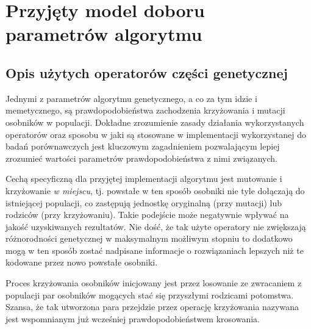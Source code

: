 \newpage
\chapter{Przyjęty model doboru parametrów algorytmu}
\label{ch:przyjety_model_doboru_parametrow_algorytmu}
\section{Opis użytych operatorów części genetycznej}
\par
Jednymi z parametrów algorytmu genetycznego, a co za tym idzie i memetycznego, są prawdopodobieństwa zachodzenia krzyżowania i mutacji osobników w populacji. Dokładne zrozumienie zasady działania wykorzystanych operatorów oraz sposobu w jaki są stosowane w implementacji wykorzystanej do badań porównawczych jest kluczowym zagadnieniem pozwalającym lepiej zrozumieć wartości parametrów prawdopodobieństwa z nimi związanych. 
\par 
Cechą specyficzną dla przyjętej implementacji algorytmu jest mutowanie i krzyżowanie \emph{w miejscu}, tj. powstałe w ten sposób osobniki nie tyle dołączają do istniejącej populacji, co zastępują jednostkę oryginalną (przy mutacji) lub rodziców (przy krzyżowaniu). Takie podejście może negatywnie wpływać na jakość uzyskiwanych rezultatów. Nie dość, że tak użyte operatory nie zwiększają różnorodności genetycznej w maksymalnym możliwym stopniu to dodatkowo mogą w ten sposób zostać nadpisane informacje o rozwiązaniach lepszych niż te kodowane przez nowo powstałe osobniki.
\par
Proces krzyżowania osobników inicjowany jest przez losowanie ze zwracaniem z populacji par osobników mogących stać się przyszłymi rodzicami potomstwa. Szansa, że tak utworzona para przejdzie przez operację krzyżowania nazywana jest wspomnianym już wcześniej prawdopodobieństwem krosowania. 
\par
